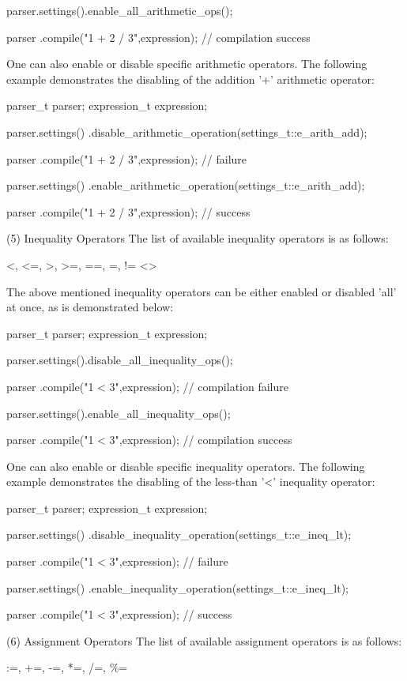 parser.settings().enable\_all\_arithmetic\_ops();

parser
.compile("1 + 2 / 3",expression); // compilation success


One  can also  enable or  disable specific  arithmetic operators.  The
following  example  demonstrates  the disabling  of  the  addition '+'
arithmetic operator:

parser\_t parser;
expression\_t expression;

parser.settings()
.disable\_arithmetic\_operation(settings\_t::e\_arith\_add);

parser
.compile("1 + 2 / 3",expression); // failure

parser.settings()
.enable\_arithmetic\_operation(settings\_t::e\_arith\_add);

parser
.compile("1 + 2 / 3",expression); // success


(5) Inequality Operators
The list of available inequality operators is as follows:

<, <=, >, >=, ==, =, != <>


The  above mentioned  inequality operators  can be  either enabled  or
disabled 'all' at once, as is demonstrated below:

parser\_t parser;
expression\_t expression;

parser.settings().disable\_all\_inequality\_ops();

parser
.compile("1 < 3",expression); // compilation failure

parser.settings().enable\_all\_inequality\_ops();

parser
.compile("1 < 3",expression); // compilation success


One  can also  enable or  disable specific  inequality operators.  The
following  example demonstrates  the disabling  of  the  less-than '<'
inequality operator:

parser\_t parser;
expression\_t expression;

parser.settings()
.disable\_inequality\_operation(settings\_t::e\_ineq\_lt);

parser
.compile("1 < 3",expression); // failure

parser.settings()
.enable\_inequality\_operation(settings\_t::e\_ineq\_lt);

parser
.compile("1 < 3",expression); // success


(6) Assignment Operators
The list of available assignment operators is as follows:

:=, +=, -=, *=, /=, \%=


